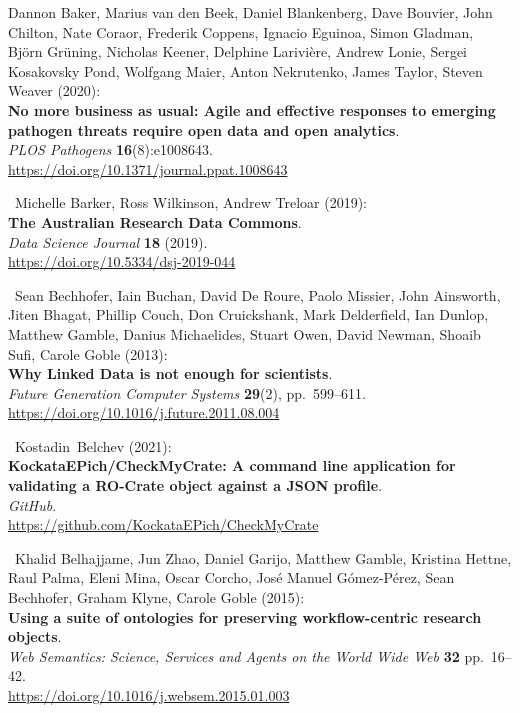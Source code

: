 \begin{thebibliography}{9}
 Dannon Baker, Marius van den Beek, Daniel Blankenberg, Dave
Bouvier, John Chilton, Nate Coraor, Frederik Coppens, Ignacio Eguinoa,
Simon Gladman, Björn Grüning, Nicholas Keener, Delphine Larivière,
Andrew Lonie, Sergei Kosakovsky Pond, Wolfgang Maier, Anton Nekrutenko,
James Taylor, Steven Weaver (2020):\\
\textbf{No more business as usual: Agile and effective responses to
emerging pathogen threats require open data and open analytics}.\\
\emph{PLOS Pathogens} \textbf{16}(8):e1008643.\\
\url{https://doi.org/10.1371/journal.ppat.1008643}

~Michelle Barker, Ross Wilkinson, Andrew Treloar (2019):\\
\textbf{The Australian Research Data Commons}.\\
\emph{Data Science Journal} \textbf{18} (2019).\\
\url{https://doi.org/10.5334/dsj-2019-044}

~Sean Bechhofer, Iain Buchan, David De Roure, Paolo Missier,
John Ainsworth, Jiten Bhagat, Phillip Couch, Don Cruickshank, Mark
Delderfield, Ian Dunlop, Matthew Gamble, Danius Michaelides, Stuart
Owen, David Newman, Shoaib Sufi, Carole Goble (2013):\\
\textbf{Why Linked Data is not enough for scientists}.\\
\emph{Future Generation Computer Systems} \textbf{29}(2),
pp.~599--611.\\
\url{https://doi.org/10.1016/j.future.2011.08.004}

~Kostadin~Belchev (2021):\\
\textbf{KockataEPich/CheckMyCrate: A command line application for
validating a RO-Crate object against a JSON profile}.\\
\emph{GitHub}.\\
\url{https://github.com/KockataEPich/CheckMyCrate}

~Khalid Belhajjame, Jun Zhao, Daniel Garijo, Matthew Gamble,
Kristina Hettne, Raul Palma, Eleni Mina, Oscar Corcho, José Manuel
Gómez-Pérez, Sean Bechhofer, Graham Klyne, Carole Goble (2015):\\
\textbf{Using a suite of ontologies for preserving workflow-centric
research objects}.\\
\emph{Web Semantics: Science, Services and Agents on the World Wide Web}
\textbf{32} pp.~16--42.\\
\url{https://doi.org/10.1016/j.websem.2015.01.003}


\end{thebibliography}
